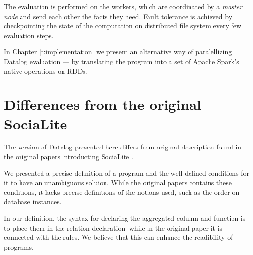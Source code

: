 The evaluation is performed on the workers, which are coordinated by a \emph{master node} and send each other the facts they need. Fault tolerance is achieved by checkpointing the state of the computation on distributed file system every few evaluation steps.

In Chapter \ref{r:implementation} we present an alternative way of paralellizing Datalog evaluation --- by translating the program into a set of Apache Spark's native operations on RDDs.


\section{Differences from the original SociaLite}

The version of Datalog presented here differs from original description found in the original papers introducting SociaLite \cite{socialite, distsoc}.

We presented a precise definition of a \datalogra program and the well-defined conditions for it to have an unambiguous soluion. While the original papers contains these conditions, it lacks precise definitions of the notions used, such as the order on database instances.

In our definition, the syntax for declaring the aggregated column and function is to place them in the relation declaration, while in the original paper it is connected with the rules. We believe that this can enhance the readibility of \datalogra programs.

